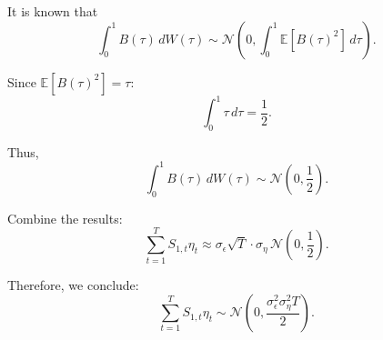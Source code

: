 \documentclass{article} %
\begin{document}
It is known that
\begin{equation}
   \int_{0}^{1} B(\tau) \, dW(\tau) \sim \mathcal{N}\left( 0, \int_{0}^{1} \mathbb{E}[B(\tau)^2] \, d\tau \right).
\end{equation}

Since \( \mathbb{E}[B(\tau)^2] = \tau \):
\begin{equation}
 \int_{0}^{1} \tau \, d\tau = \frac{1}{2}.
\end{equation}

Thus,
\begin{equation}
 \int_{0}^{1} B(\tau) \, dW(\tau) \sim \mathcal{N}\left( 0, \frac{1}{2} \right).
\end{equation}

Combine the results:
\begin{equation}
 \sum_{t=1}^{T} S_{1,t} \eta_t \approx \sigma_{\epsilon} \sqrt{T} \cdot \sigma_{\eta}\, \mathcal{N}\left( 0, \frac{1}{2} \right).
\end{equation}

Therefore, we conclude:
\begin{equation}
 \sum_{t=1}^{T} S_{1,t} \eta_t \sim \mathcal{N}\left( 0, \frac{\sigma_{\epsilon}^2 \sigma_{\eta}^2 T}{2} \right).
\end{equation}
\end{document}
